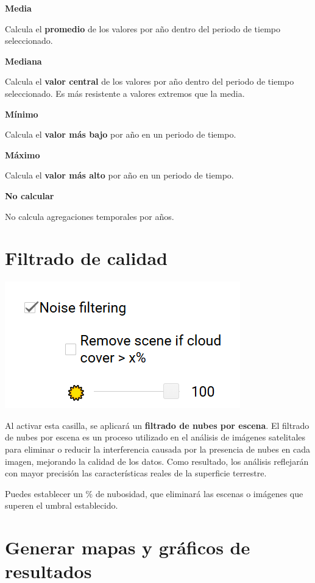 \documentclass[
]{book}
\begin{document}
\textbf{Media}

Calcula el \textbf{promedio} de los valores por año dentro del periodo de tiempo seleccionado.

\textbf{Mediana}

Calcula el \textbf{valor central} de los valores por año dentro del periodo de tiempo seleccionado. Es más resistente a valores extremos que la media.

\textbf{Mínimo}

Calcula el \textbf{valor más bajo} por año en un periodo de tiempo.

\textbf{Máximo}

Calcula el \textbf{valor más alto} por año en un periodo de tiempo.

\textbf{No calcular}

No calcula agregaciones temporales por años.

\chapter{Filtrado de calidad}\label{filtrado-nubes}

\includegraphics{assets/filter.png}

Al activar esta casilla, se aplicará un \textbf{filtrado de nubes por escena}. El filtrado de nubes por escena es un proceso utilizado en el análisis de imágenes satelitales para eliminar o reducir la interferencia causada por la presencia de nubes en cada imagen, mejorando la calidad de los datos. Como resultado, los análisis reflejarán con mayor precisión las características reales de la superficie terrestre.

Puedes establecer un \% de nubosidad, que eliminará las escenas o imágenes que superen el umbral establecido.

\chapter{Generar mapas y gráficos de resultados}\label{mapas-graficos}
\end{document}
